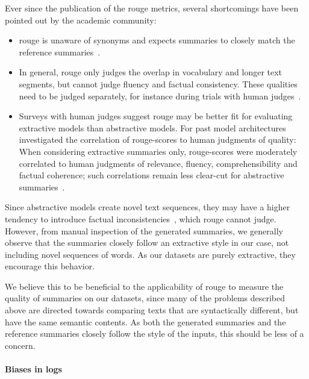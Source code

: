 Ever since the publication of the \acs*{rouge} metrics, several shortcomings have been pointed out by the academic community:
\begin{itemize}
\item \Acs*{rouge} is unaware of synonyms and expects summaries to closely match the reference summaries~\parencite{rouge2}.
\item In general, \acs*{rouge} only judges the overlap in vocabulary and longer text segments,
      but cannot judge fluency and factual consistency.
      These qualities need to be judged separately, for instance during trials with human judges~\parencite[546]{summarization_critical_evaluation}.
\item Surveys with human judges suggest \acs*{rouge} may be better fit for evaluating extractive models than abstractive models.
      For past model architectures \citeauthor*{summarization_critical_evaluation}
      investigated the correlation of \acs*{rouge}-scores to human judgments of quality:\\
      When considering extractive summaries only, \acs*{rouge}-scores were moderately correlated to human judgments of relevance, fluency, comprehensibility and factual coherence;
      such correlations remain less clear-cut for abstractive summaries~\parencite[545-546]{summarization_critical_evaluation}.
\end{itemize}

Since abstractive models create novel text sequences,
they may have a higher tendency to introduce factual inconsistencies~\parencite[546]{summarization_critical_evaluation},
which \acs*{rouge} cannot judge.
However, from manual inspection of the generated summaries,
we generally observe that the summaries closely follow an extractive style in our case,
not including novel sequences of words.
As our datasets are purely extractive, they encourage this behavior.

We believe this to be beneficial to the applicability of \acs*{rouge} to measure the quality of summaries on our datasets,
since many of the problems described above are directed towards comparing texts that are syntactically different,
but have the same semantic contents.
As both the generated summaries and the reference summaries closely follow the style of the inputs, this should be less of a concern.

\paragraph{Biases in logs}

